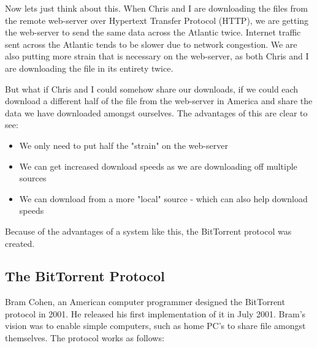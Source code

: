 Now lets just think about this. When Chris and I are downloading the files from the remote web-server over Hypertext Transfer Protocol (HTTP), we are getting the web-server to send the same data across the Atlantic twice. Internet traffic sent across the Atlantic tends to be slower due to network congestion. We are also putting more strain that is necessary on the web-server, as both Chris and I are downloading the file in its entirety twice. 

But what if Chris and I could somehow share our downloads, if we could each download a different half of the file from the web-server in America and share the data we have downloaded amongst ourselves. The advantages of this are clear to see: 

\begin{itemize}
\item We only need to put half the "strain" on the web-server
\item We can get increased download speeds as we are downloading off multiple sources
\item We can download from a more "local" source - which can also help download speeds
\end{itemize}

Because of the advantages of a system like this, the BitTorrent protocol was created.

\subsection{The BitTorrent Protocol}
Bram Cohen, an American computer programmer designed the BitTorrent protocol in 2001. He released his first implementation of it in July 2001\cite{Reference4}. Bram's vision was to enable simple computers, such as home PC's to share file amongst themselves. The protocol works as follows:

